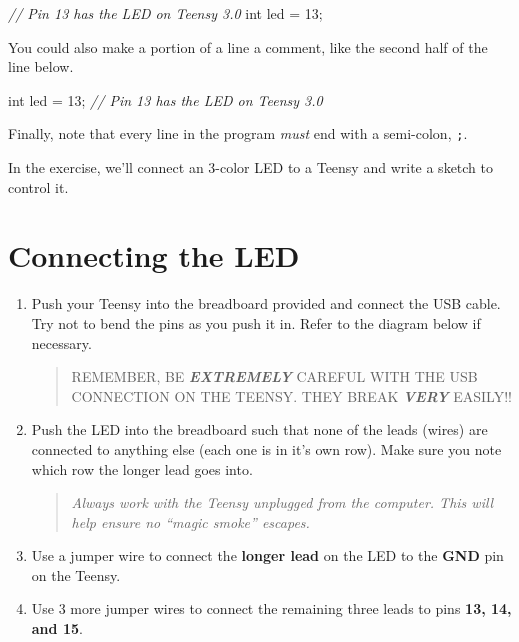 \documentclass[]{book}
\newenvironment{Shaded}{\begin{snugshade}}{\end{snugshade}}
\newcommand{\CommentTok}[1]{\textcolor[rgb]{0.56,0.35,0.01}{\textit{#1}}}
\newcommand{\DataTypeTok}[1]{\textcolor[rgb]{0.13,0.29,0.53}{#1}}
\newcommand{\DecValTok}[1]{\textcolor[rgb]{0.00,0.00,0.81}{#1}}
\newcommand{\NormalTok}[1]{#1}
\begin{document}
\begin{Shaded}
\begin{Highlighting}[]
    \CommentTok{// Pin 13 has the LED on Teensy 3.0}
    \DataTypeTok{int}\NormalTok{ led = }\DecValTok{13}\NormalTok{;}
\end{Highlighting}
\end{Shaded}

You could also make a portion of a line a comment, like the second half of the line below.

\begin{Shaded}
\begin{Highlighting}[]
    \DataTypeTok{int}\NormalTok{ led = }\DecValTok{13}\NormalTok{; }\CommentTok{// Pin 13 has the LED on Teensy 3.0}
\end{Highlighting}
\end{Shaded}

Finally, note that every line in the program \emph{must} end with a semi-colon, \texttt{;}.

In the exercise, we'll connect an 3-color LED to a Teensy and write a sketch to control it.

\hypertarget{connecting-the-led}{%
\section{Connecting the LED}\label{connecting-the-led}}

\begin{enumerate}
\def\labelenumi{\arabic{enumi}.}
\item
  Push your Teensy into the breadboard provided and connect the USB cable. Try not to bend the pins as you push it in. Refer to the diagram below if necessary.

  \begin{quote}
  REMEMBER, BE \textbf{\emph{EXTREMELY}} CAREFUL WITH THE USB CONNECTION ON THE TEENSY. THEY BREAK \textbf{\emph{VERY}} EASILY!!
  \end{quote}
\item
  Push the LED into the breadboard such that none of the leads (wires) are connected to anything else (each one is in it's own row). Make sure you note which row the longer lead goes into.

  \begin{quote}
  \emph{Always work with the Teensy unplugged from the computer. This will help ensure no ``magic smoke'' escapes.}
  \end{quote}
\item
  Use a jumper wire to connect the \textbf{longer lead} on the LED to the \textbf{GND} pin on the Teensy.
\item
  Use 3 more jumper wires to connect the remaining three leads to pins \textbf{13, 14, and 15}.
\end{enumerate}
\end{document}
